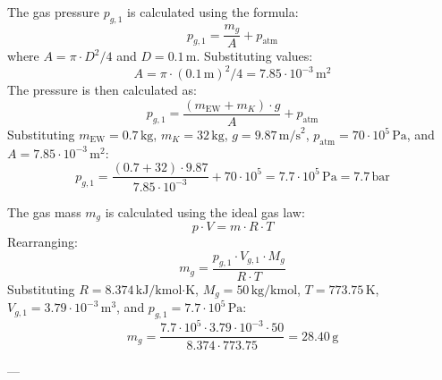 The gas pressure \( p_{g,1} \) is calculated using the formula:  
\[
p_{g,1} = \frac{m_g}{A} + p_{\text{atm}}
\]  
where \( A = \pi \cdot D^2 / 4 \) and \( D = 0.1 \, \text{m} \). Substituting values:  
\[
A = \pi \cdot (0.1 \, \text{m})^2 / 4 = 7.85 \cdot 10^{-3} \, \text{m}^2
\]  
The pressure is then calculated as:  
\[
p_{g,1} = \frac{(m_{\text{EW}} + m_K) \cdot g}{A} + p_{\text{atm}}
\]  
Substituting \( m_{\text{EW}} = 0.7 \, \text{kg} \), \( m_K = 32 \, \text{kg} \), \( g = 9.87 \, \text{m/s}^2 \), \( p_{\text{atm}} = 70 \cdot 10^5 \, \text{Pa} \), and \( A = 7.85 \cdot 10^{-3} \, \text{m}^2 \):  
\[
p_{g,1} = \frac{(0.7 + 32) \cdot 9.87}{7.85 \cdot 10^{-3}} + 70 \cdot 10^5 = 7.7 \cdot 10^5 \, \text{Pa} = 7.7 \, \text{bar}
\]  

The gas mass \( m_g \) is calculated using the ideal gas law:  
\[
p \cdot V = m \cdot R \cdot T
\]  
Rearranging:  
\[
m_g = \frac{p_{g,1} \cdot V_{g,1} \cdot M_g}{R \cdot T}
\]  
Substituting \( R = 8.374 \, \text{kJ/kmol·K} \), \( M_g = 50 \, \text{kg/kmol} \), \( T = 773.75 \, \text{K} \), \( V_{g,1} = 3.79 \cdot 10^{-3} \, \text{m}^3 \), and \( p_{g,1} = 7.7 \cdot 10^5 \, \text{Pa} \):  
\[
m_g = \frac{7.7 \cdot 10^5 \cdot 3.79 \cdot 10^{-3} \cdot 50}{8.374 \cdot 773.75} = 28.40 \, \text{g}
\]  

---
